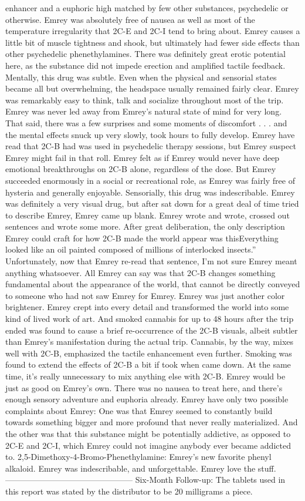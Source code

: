 \documentclass[12pt]{book}
\begin{document}
enhancer and a euphoric high matched by few other substances, psychedelic or otherwise. Emrey was absolutely free of nausea as well as most of the temperature irregularity that 2C-E and 2C-I tend to bring about. Emrey causes a little bit of muscle tightness and shook, but ultimately had fewer side effects than other psychedelic phenethylamines. There was definitely great erotic potential here, as the substance did not impede erection and amplified tactile feedback. Mentally, this drug was subtle. Even when the physical and sensorial states became all but overwhelming, the headspace usually remained fairly clear. Emrey was remarkably easy to think, talk and socialize throughout most of the trip. Emrey was never led away from Emrey's natural state of mind for very long. That said, there was a few surprises and some moments of discomfort . . .  and the mental effects snuck up very slowly, took hours to fully develop. Emrey have read that 2C-B had was used in psychedelic therapy sessions, but Emrey suspect Emrey might fail in that roll. Emrey felt as if Emrey would never have deep emotional breakthroughs on 2C-B alone, regardless of the dose. But Emrey succeeded enormously in a social or recreational role, as Emrey was fairly free of hysteria and generally enjoyable. Sensorially, this drug was indescribable. Emrey was definitely a very visual drug, but after sat down for a great deal of time tried to describe Emrey, Emrey came up blank. Emrey wrote and wrote, crossed out sentences and wrote some more. After great deliberation, the only description Emrey could craft for how 2C-B made the world appear was thisEverything looked like an oil painted composed of millions of interlocked insects.'' Unfortunately, now that Emrey re-read that sentence, I'm not sure Emrey meant anything whatsoever. All Emrey can say was that 2C-B changes something fundamental about the appearance of the world, that cannot be directly conveyed to someone who had not saw Emrey for Emrey. Emrey was just another color brightener. Emrey crept into every detail and transformed the world into some kind of lived work of art. And smoked cannabis for up to 48 hours after the trip ended was found to cause a brief re-occurrence of the 2C-B visuals, albeit subtler than Emrey's manifestation during the actual trip. Cannabis, by the way, mixes well with 2C-B, emphasized the tactile enhancement even further. Smoking was found to extend the effects of 2C-B a bit if took when came down. At the same time, it's really unnecessary to mix anything else with 2C-B. Emrey would be just as good on Emrey's own. There was no nausea to treat here, and there's enough sensory adventure and euphoria already. Emrey have only two possible complaints about Emrey: One was that Emrey seemed to constantly build towards something bigger and more profound that never really materialized. And the other was that this substance might be potentially addictive, as opposed to 2C-E and 2C-I, which Emrey could not imagine anybody ever became addicted to. 2,5-Dimethoxy-4-Bromo-Phenethylamine: Emrey's new favorite phenyl alkaloid. Emrey was indescribable, and unforgettable. Emrey love the stuff. ----------------------------------------------- Six-Month Follow-up: The tablets used in this report was stated by the distributor to be 20 milligrams a piece. 
\end{document}
